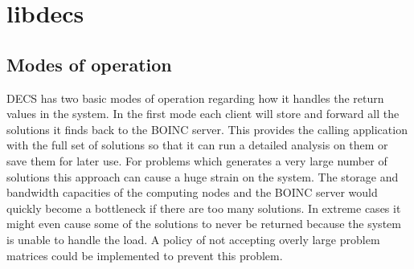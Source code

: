 










\section{libdecs}


\subsection{Modes of operation}

DECS has two basic modes of operation regarding how it handles the return values in the system.
In the first mode each client will store and forward all the solutions it finds back to the BOINC server.
This provides the calling application with the full set of solutions so that it can run a detailed analysis on them or save them for later use.
For problems which generates a very large number of solutions this approach can cause a huge strain on the system.
The storage and bandwidth capacities of the computing nodes and the BOINC server would quickly become a bottleneck if there are too many solutions.
In extreme cases it might even cause some of the solutions to never be returned because the system is unable to handle the load.
A policy of not accepting overly large problem matrices could be implemented to prevent this problem.


